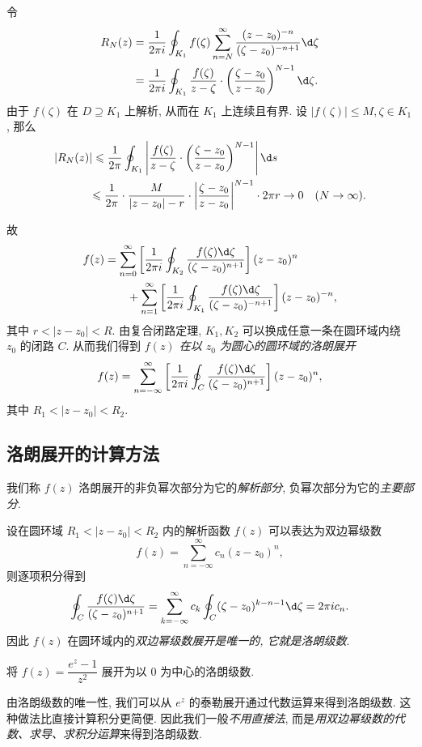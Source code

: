 令
\begin{align*}
	R_N(z)&=\frac1{2\pi i}\oint_{K_1}f(\zeta)\sum_{n=N}^\infty\frac{(z-z_0)^{-n}}{(\zeta-z_0)^{-n+1}}\d\zeta\\
	&=\frac1{2\pi i}\oint_{K_1}\frac{f(\zeta)}{z-\zeta}\cdot\left(\frac{\zeta-z_0}{z-z_0}\right)^{N-1}\d\zeta.
\end{align*}
由于 $f(\zeta)$ 在 $D\supseteq K_1$ 上解析, 从而在 $K_1$ 上连续且有界.
设 $|f(\zeta)|\le M,\zeta\in K_1$,
那么
\begin{align*}
|R_N(z)|&\le\frac 1{2\pi}\oint_{K_1}\abs{\frac{f(\zeta)}{z-\zeta}\cdot\left(\frac{\zeta-z_0}{z-z_0}\right)^{N-1}}\d s\\
&{\le\frac 1{2\pi}\cdot\frac M{|z-z_0|-r}\cdot\abs{\frac{\zeta-z_0}{z-z_0}}^{N-1}\cdot 2\pi r\to 0\quad (N\to\infty).}
\end{align*}

故
\begin{align*}
f(z)&=\sum_{n=0}^\infty\left[\frac1{2\pi i}\oint_{K_2}\frac{f(\zeta)\d\zeta}{(\zeta-z_0)^{n+1}}\right](z-z_0)^n\\
&\qquad+\sum_{n=1}^\infty \left[\frac1{2\pi i}\oint_{K_1}\frac{f(\zeta)\d\zeta}{(\zeta-z_0)^{-n+1}}\right](z-z_0)^{-n},
\end{align*}
其中 $r<|z-z_0|<R$.
由复合闭路定理, $K_1,K_2$ 可以换成任意一条在圆环域内绕 $z_0$ 的闭路 $C$.
从而我们得到 \emph{$f(z)$ 在以 $z_0$ 为圆心的圆环域的洛朗展开}
	\[f(z)=\sum_{n=-\infty}^\infty\left[\frac1{2\pi i}\oint_C\frac{f(\zeta)\d\zeta}{(\zeta-z_0)^{n+1}}\right](z-z_0)^n,\]
其中 $R_1<|z-z_0|<R_2$.

\subsection{洛朗展开的计算方法}

我们称 $f(z)$ 洛朗展开的非负幂次部分为它的\emph{解析部分}, 负幂次部分为它的\emph{主要部分}.

设在圆环域 $R_1<|z-z_0|<R_2$ 内的解析函数 $f(z)$ 可以表达为双边幂级数
\[f(z)=\sum_{n=-\infty}^\infty c_n(z-z_0)^n,\]
则逐项积分得到
\[\oint_C\frac{f(\zeta)\d\zeta}{(\zeta-z_0)^{n+1}}=\sum_{k=-\infty}^\infty c_k\oint_C(\zeta-z_0)^{k-n-1}\d\zeta=2\pi i c_n.\]
因此 $f(z)$ 在圆环域内的\emph{双边幂级数展开是唯一的, 它就是洛朗级数}.

\begin{example}
	将 $f(z)=\dfrac{e^z-1}{z^2}$ 展开为以 $0$ 为中心的洛朗级数.
\end{example}

由洛朗级数的唯一性, 我们可以从 $e^z$ 的泰勒展开通过代数运算来得到洛朗级数.
这种做法比直接计算积分更简便.
因此我们一般\emph{不用直接法}, 而是\emph{用双边幂级数的代数、求导、求积分运算}来得到洛朗级数.

